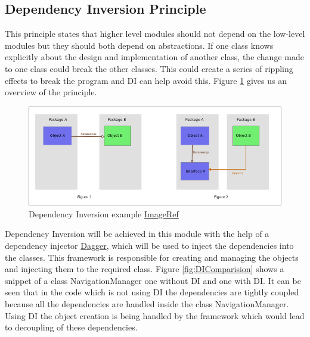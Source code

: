 \subsection{Dependency Inversion Principle}
    This principle states that higher level modules should not depend on 
    the low-level modules but they should both depend on abstractions. If one class 
    knows explicitly about the design and implementation of another class,
    the change made to one class could break the other classes. This could
    create a series of rippling effects to break the program and DI can help avoid this. Figure
    \ref{fig:DIExample} gives us an overview of the principle.

    \begin{figure}[htbp!]
        \centering \includegraphics[scale=0.85]{grafiken/di.jpg}
        \caption{Dependency Inversion example
        \href{https://upload.wikimedia.org/wikipedia/commons/9/96/Dependency_inversion.png}{ImageRef}}
        \label{fig:DIExample}
    \end{figure}

    \par
        Dependency Inversion will be achieved in this module with the help of a dependency
        injector \href{http://square.github.io/dagger/}{Dagger}, which 
        will be used to inject the dependencies into the classes. 
        This framework is responsible for creating and managing the 
        objects and injecting them to the required
        class. 
        Figure \ref{fig:DIComparision} shows a snippet of a class 
        NavigationManager one without DI and one with DI.
        It can be seen that in the code which is not using 
        DI the dependencies are tightly coupled because all the
        dependencies are handled inside the class NavigationManager.
        Using DI the object creation is being handled by the
        framework which would lead to decoupling of these dependencies.

    
        